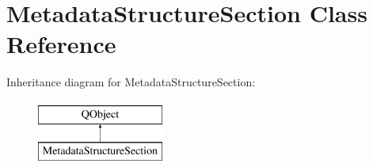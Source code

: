 \hypertarget{class_metadata_structure_section}{}\section{Metadata\+Structure\+Section Class Reference}
\label{class_metadata_structure_section}
Inheritance diagram for Metadata\+Structure\+Section\+:\begin{figure}[H]
\begin{center}
\leavevmode
\includegraphics[height=2.000000cm]{class_metadata_structure_section}
\end{center}
\end{figure}
